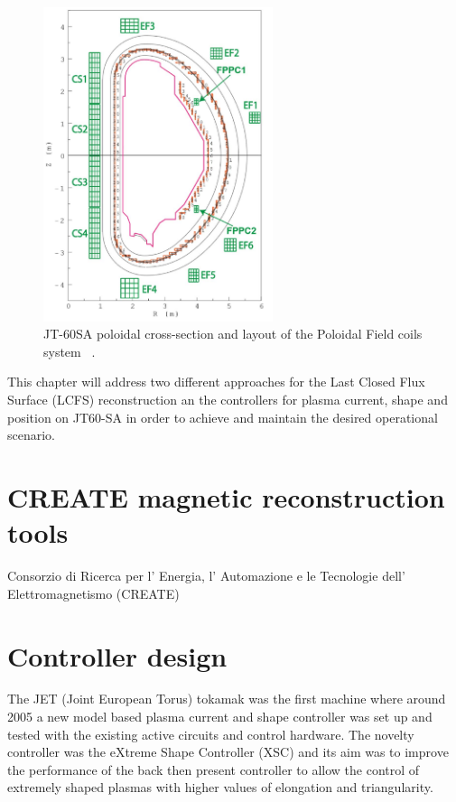 \begin{figure}
	\centering
	\includegraphics[width=0.6\textwidth]{Chp3/JT60Coils.png}

	\caption{	\label{JT60coils}JT-60SA poloidal cross-section and layout of the Poloidal Field coils system ~\cite{NCruz}.}
\end{figure}


This chapter will address two different approaches for the Last Closed Flux Surface (LCFS) reconstruction an the controllers for plasma current, shape and position on  JT60-SA in order to achieve and maintain the desired operational scenario. 

\section{CREATE magnetic reconstruction tools}
Consorzio di Ricerca per l' Energia, l' Automazione e le Tecnologie dell' Elettromagnetismo (CREATE)

\section{Controller design}
The JET (Joint European Torus) tokamak was the first machine where around 2005 a new model based plasma current and shape controller was set up and tested  with the existing active circuits and control hardware. The novelty controller was the eXtreme Shape Controller (XSC) and its aim was to improve  the performance of the back then present controller to allow the control of extremely shaped plasmas with higher values of elongation and triangularity. ~\cite{Albanese2005} 
 

